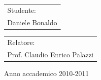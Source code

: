 \begin{titlepage}
    \begin{tabular}{l}
        Studente:\\
        Daniele Bonaldo\\
    \end{tabular}
    \hfill
    \begin{tabular}{l}
        Relatore:\\
        Prof. Claudio Enrico Palazzi\\
    \end{tabular}
    \vfill
    \vspace{0.5cm}
        \begin{center}
            Anno accademico 2010-2011 \\
        \end{center}
\end{titlepage}

\clearpage{\pagestyle{empty}\cleardoublepage}
